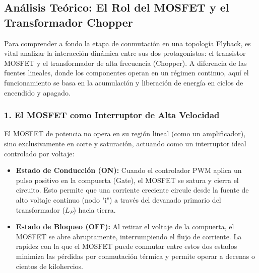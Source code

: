 \documentclass[12pt, a4paper]{article}
\begin{document}
\subsection{Análisis Teórico: El Rol del MOSFET y el Transformador Chopper}

Para comprender a fondo la etapa de conmutación en una topología Flyback, es vital analizar la interacción dinámica entre sus dos protagonistas: el transistor MOSFET y el transformador de alta frecuencia (Chopper). A diferencia de las fuentes lineales, donde los componentes operan en un régimen continuo, aquí el funcionamiento se basa en la acumulación y liberación de energía en ciclos de encendido y apagado.

\subsubsection*{1. El MOSFET como Interruptor de Alta Velocidad}
El MOSFET de potencia no opera en su región lineal (como un amplificador), sino exclusivamente en corte y saturación, actuando como un interruptor ideal controlado por voltaje:
\begin{itemize}
    \item \textbf{Estado de Conducción (ON):} Cuando el controlador PWM aplica un pulso positivo en la compuerta (Gate), el MOSFET se satura y cierra el circuito. Esto permite que una corriente creciente circule desde la fuente de alto voltaje continuo (nodo "i") a través del devanado primario del transformador ($L_P$) hacia tierra.
    \item \textbf{Estado de Bloqueo (OFF):} Al retirar el voltaje de la compuerta, el MOSFET se abre abruptamente, interrumpiendo el flujo de corriente. La rapidez con la que el MOSFET puede conmutar entre estos dos estados minimiza las pérdidas por conmutación térmica y permite operar a decenas o cientos de kilohercios.
\end{itemize}
\end{document}
